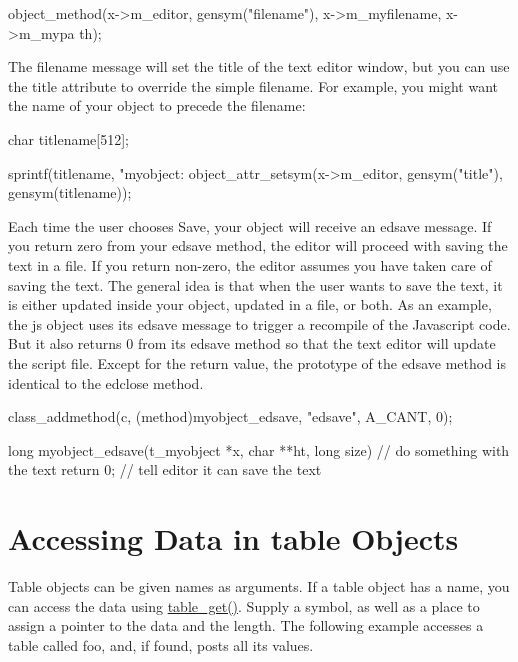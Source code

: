 \begin{DoxyCode}
        object_method(x->m_editor, gensym("filename"), x->m_myfilename, x->m_mypa
      th);
\end{DoxyCode}


The filename message will set the title of the text editor window, but you can use the title attribute to override the simple filename. For example, you might want the name of your object to precede the filename: 
\begin{DoxyCode}
        char titlename[512];

        sprintf(titlename, "myobject: %
        object_attr_setsym(x->m_editor, gensym("title"), gensym(titlename));
\end{DoxyCode}


Each time the user chooses Save, your object will receive an edsave message. If you return zero from your edsave method, the editor will proceed with saving the text in a file. If you return non-\/zero, the editor assumes you have taken care of saving the text. The general idea is that when the user wants to save the text, it is either updated inside your object, updated in a file, or both. As an example, the js object uses its edsave message to trigger a recompile of the Javascript code. But it also returns 0 from its edsave method so that the text editor will update the script file. Except for the return value, the prototype of the edsave method is identical to the edclose method.


\begin{DoxyCode}
    class_addmethod(c, (method)myobject_edsave, "edsave", A_CANT, 0);

    long myobject_edsave(t_myobject *x, char **ht, long size)
    {
        // do something with the text
        return 0;       // tell editor it can save the text
    }
\end{DoxyCode}
\hypertarget{chapter_enhancements_chapter_enhancements_tables}{}\section{Accessing Data in table Objects}\label{chapter_enhancements_chapter_enhancements_tables}
Table objects can be given names as arguments. If a table object has a name, you can access the data using \hyperlink{group__tables_ga2c08d1383a235eb8c106c0f3afea6d21}{table\_\-get()}. Supply a symbol, as well as a place to assign a pointer to the data and the length. The following example accesses a table called foo, and, if found, posts all its values.


